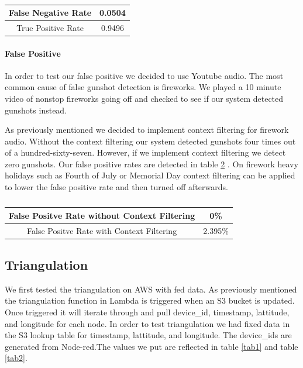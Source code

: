 \documentclass[conference]{IEEEtran}
\begin{document}
\begin{table}[htbp]
\caption{}
\begin{center}
 \begin{tabular}{||c || c||} 

 \hline
False Negative Rate & 0.0504\\
 \hline
True Positive Rate &0.9496\\
 \hline
\end{tabular}
\label{tab0}
\end{center}
\end{table}

\paragraph{False Positive} In order to test our false positive we decided to use Youtube audio. The most common cause of false gunshot detection is fireworks. We played a 10 minute video of nonstop fireworks going off and checked to see if our system detected gunshots instead.

As previously mentioned we decided to implement context filtering for firework audio. Without the context filtering our system detected gunshots four times out of a hundred-sixty-seven. However, if we implement context filtering we detect zero gunshots. Our false positive rates are detected in table  \ref{tab3} . On firework heavy holidays such as Fourth of July or Memorial Day context filtering can be applied to lower the false positive rate and then turned off afterwards. 
\begin{table}[htbp]
\caption{}
\begin{center}
 \begin{tabular}{||c || c||} 

 \hline
False Positve Rate without Context Filtering  & 0\%\\
 \hline
False Positve Rate with Context Filtering  & 2.395\%\\
 \hline
\end{tabular}
\label{tab3}
\end{center}
\end{table}

\subsection{Triangulation}
We first tested the triangulation on AWS with fed data. As previously mentioned the triangulation function in Lambda is triggered when an S3 bucket is updated. Once triggered it will iterate through and pull device\_id, timestamp, lattitude, and longitude for each node. In order to test triangulation we had fixed data in the S3 lookup table for timestamp, lattitude, and longitude. The device\_ids are generated from Node-red.The values we put are reflected in table  \ref{tab1} and table  \ref{tab2}.
\end{document}
